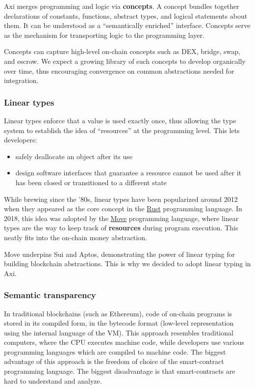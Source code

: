 \documentclass[a4paper]{article}
\begin{document}
Axi merges programming and logic via \textbf{concepts}. A concept bundles together declarations of constants, functions, abstract types, and logical statements about them. It can be understood as a ``semantically enriched'' interface. Concepts serve as the mechanism for transporting logic to the programming layer.

Concepts can capture high-level on-chain concepts such as DEX, bridge, swap, and escrow. We expect a growing library of such concepts to develop organically over time, thus encouraging convergence on common abstractions needed for integration.

\subsubsection{Linear types}

Linear types enforce that a value is used exactly once, thus allowing the type system to establish the idea of ``resources'' at the programming level. This lets developers:

\begin{itemize}
  \item safely deallocate an object after its use
  \item design software interfaces that guarantee a resource cannot be used after it has been closed or transitioned to a different state
\end{itemize}

While brewing since the '80s, linear types have been popularized around 2012 when they appeared as the core concept in the \href{https://en.wikipedia.org/wiki/Rust_(programming_language)}{Rust} programming language. In 2018, this idea was adopted by the \href{https://move-book.com/}{Move} programming language, where linear types are the way to keep track of \textbf{resources} during program execution. This neatly fits into the on-chain money abstraction.

Move underpins Sui and Aptos, demonstrating the power of linear typing for building blockchain abstractions. This is why we decided to adopt linear typing in Axi.

\subsubsection{Semantic transparency}

In traditional blockchains (such as Ethereum), code of on-chain programs is stored in its compiled form, in the bytecode format (low-level representation using the internal language of the VM). This approach resembles traditional computers, where the CPU executes machine code, while developers use various programming languages which are compiled to machine code. The biggest advantage of this approach is the freedom of choice of the smart-contract programming language. The biggest disadvantage is that smart-contracts are hard to understand and analyze.
\end{document}
